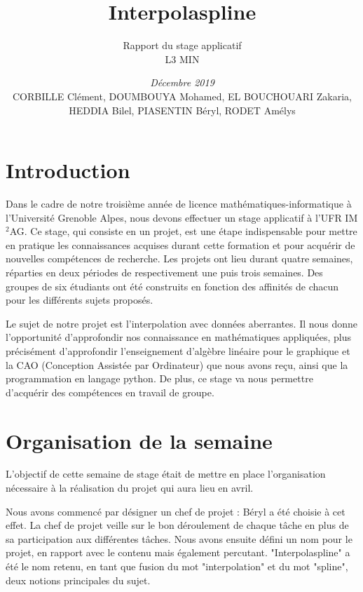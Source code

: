 \documentclass[a4paper,12pt]{article} %
\title{\textbf{Interpolaspline}}
\author{Rapport du stage applicatif\\ L3 MIN}
\date{\emph{Décembre 2019}\\CORBILLE Clément, DOUMBOUYA Mohamed, EL BOUCHOUARI Zakaria, HEDDIA Bilel, PIASENTIN Béryl, RODET Amélys}
\begin{document}

\maketitle %
\tableofcontents %

\newpage

\section*{Introduction}
Dans le cadre de notre troisième année de licence mathématiques-informatique à l’Université Grenoble Alpes, nous devons effectuer un stage applicatif à l’UFR IM$^2$AG. Ce stage, qui consiste en un projet, est une étape indispensable pour mettre en pratique les connaissances acquises durant cette formation et pour acquérir de nouvelles compétences de recherche. Les projets ont lieu durant quatre semaines, réparties en deux périodes de respectivement une puis trois semaines. Des groupes de six étudiants ont été construits en fonction des affinités de chacun pour les différents sujets proposés.

Le sujet de notre projet est l'interpolation avec données aberrantes. Il nous donne l’opportunité d’approfondir nos connaissance en mathématiques appliquées, plus précisément d'approfondir l'enseignement d'algèbre linéaire pour le graphique et la CAO (Conception Assistée par Ordinateur) que nous avons reçu, ainsi que la programmation en langage  python. De plus, ce stage va nous permettre d'acquérir des compétences en travail de groupe.

\section{Organisation de la semaine}

L'objectif de cette semaine de stage était de mettre en place l'organisation nécessaire à la réalisation du projet qui aura lieu en avril.

Nous avons commencé par désigner un chef de projet : Béryl a été choisie à cet effet. La chef de projet veille sur le bon déroulement de chaque tâche en plus de sa participation aux différentes tâches. Nous avons ensuite défini un nom pour le projet, en rapport avec le contenu mais également percutant. "Interpolaspline" a été le nom retenu, en tant que fusion du mot "interpolation" et du mot "spline", deux notions principales du sujet.
\end{document}
